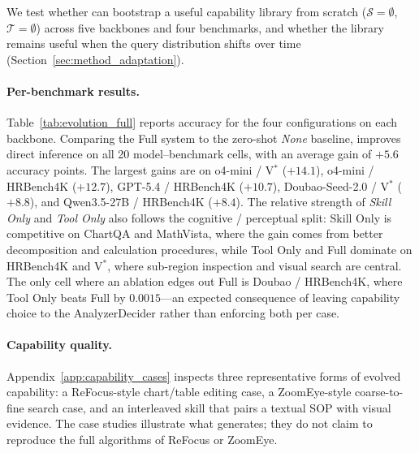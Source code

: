 We test whether \sysname{} can bootstrap a useful capability library from scratch
($\mathcal{S}{=}\emptyset$, $\mathcal{T}{=}\emptyset$) across five backbones and four
benchmarks, and whether the library remains useful when the query distribution shifts
over time (Section~\ref{sec:method_adaptation}).

\paragraph{Per-benchmark results.}
Table~\ref{tab:evolution_full} reports accuracy for the four configurations on each
backbone. Comparing the Full system to the zero-shot \emph{None} baseline, \sysname{}
improves direct inference on all 20 model--benchmark cells, with an average gain of $+5.6$
accuracy points. The largest gains are on o4-mini / V$^*$ ($+14.1$), o4-mini / HRBench4K
($+12.7$), GPT-5.4 / HRBench4K ($+10.7$), Doubao-Seed-2.0 / V$^*$ ($+8.8$), and
Qwen3.5-27B / HRBench4K ($+8.4$). The relative strength of \emph{Skill Only} and \emph{Tool
Only} also follows the cognitive / perceptual split: Skill Only is competitive on ChartQA
and MathVista, where the gain comes from better decomposition and calculation procedures,
while Tool Only and Full dominate on HRBench4K and V$^*$, where sub-region inspection and
visual search are central. The only cell where an ablation edges out Full is Doubao /
HRBench4K, where Tool Only beats Full by $0.0015$---an expected consequence of leaving
capability choice to the AnalyzerDecider rather than enforcing both per case.

\paragraph{Capability quality.}
Appendix~\ref{app:capability_cases} inspects three representative forms of evolved
capability: a ReFocus-style chart/table editing case, a ZoomEye-style coarse-to-fine
search case, and an interleaved skill that pairs a textual SOP with visual evidence. The
case studies illustrate what \sysname{} generates; they do not claim to reproduce the full
algorithms of ReFocus or ZoomEye.

